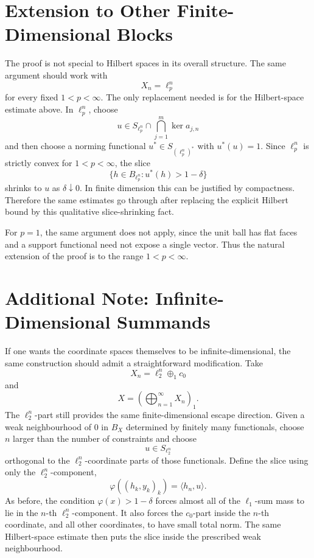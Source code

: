 \documentclass[11pt]{article}
\begin{document}
\section*{Extension to Other Finite-Dimensional Blocks}

The proof is not special to Hilbert spaces in its overall structure. The same argument should work with
\[
  X_n=\ell_p^n
\]
for every fixed \(1<p<\infty\). The only replacement needed is for the Hilbert-space estimate above. In \(\ell_p^n\), choose
\[
  u\in S_{\ell_p^n}\cap \bigcap_{j=1}^m \ker a_{j,n}
\]
and then choose a norming functional \(u^*\in S_{(\ell_p^n)^*}\) with \(u^*(u)=1\). Since \(\ell_p^n\) is strictly convex for \(1<p<\infty\), the slice
\[
  \{h\in B_{\ell_p^n}: u^*(h)>1-\delta\}
\]
shrinks to \(u\) as \(\delta\downarrow0\). In finite dimension this can be justified by compactness. Therefore the same estimates go through after replacing the explicit Hilbert bound by this qualitative slice-shrinking fact.

For \(p=1\), the same argument does not apply, since the unit ball has flat faces and a support functional need not expose a single vector. Thus the natural extension of the proof is to the range \(1<p<\infty\).

\section*{Additional Note: Infinite-Dimensional Summands}

If one wants the coordinate spaces themselves to be infinite-dimensional, the same construction should admit a straightforward modification. Take
\[
  X_n=\ell_2^n\oplus_1 c_0
\]
and
\[
  X=\left(\bigoplus_{n=1}^\infty X_n\right)_1.
\]
The \(\ell_2^n\)-part still provides the same finite-dimensional escape direction. Given a weak neighbourhood of \(0\) in \(B_X\) determined by finitely many functionals, choose \(n\) larger than the number of constraints and choose
\[
  u\in S_{\ell_2^n}
\]
orthogonal to the \(\ell_2^n\)-coordinate parts of those functionals. Define the slice using only the \(\ell_2^n\)-component,
\[
  \varphi((h_k,y_k)_k)=\langle h_n,u\rangle.
\]
As before, the condition \(\varphi(x)>1-\delta\) forces almost all of the \(\ell_1\)-sum mass to lie in the \(n\)-th \(\ell_2^n\)-component. It also forces the \(c_0\)-part inside the \(n\)-th coordinate, and all other coordinates, to have small total norm. The same Hilbert-space estimate then puts the slice inside the prescribed weak neighbourhood.
\end{document}
